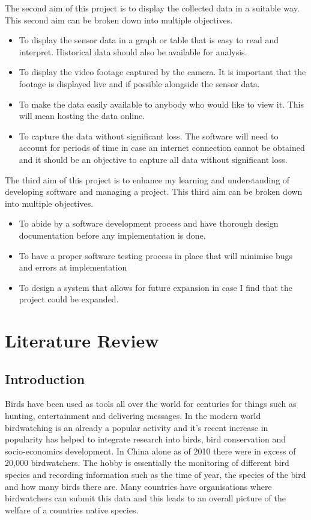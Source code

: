 \documentclass[10pt,a4paper]{article}
\begin{document}
The second aim of this project is to display the collected data in a suitable way. This second aim can be broken down into multiple objectives.
\begin{itemize}
\item To display the sensor data in a graph or table that is easy to read and interpret. Historical data should also be available for analysis. 

\item To display the video footage captured by the camera. It is important that the footage is displayed live and if possible alongside the sensor data. 

\item To make the data easily available to anybody who would like to view it. This will mean hosting the data online. 

\item To capture the data without significant loss. The software will need to account for periods of time in case an internet connection cannot be obtained and it should be an objective to capture all data without significant loss. 
\end{itemize}

The third aim of this project is to enhance my learning and understanding of developing software and managing a project. This third aim can be broken down into multiple objectives. 
\begin{itemize}
\item To abide by a software development process and have thorough design documentation before any implementation is done. 

\item To have a proper software testing process in place that will minimise bugs and errors at implementation

\item To design a system that allows for future expansion in case I find that the project could be expanded. 
\end{itemize}

\section{Literature Review}
\subsection{Introduction}
Birds have been used as tools all over the world for centuries for things such as hunting, entertainment and delivering messages. In the modern world birdwatching is an already a popular activity and it's recent increase in popularity has helped to integrate research into birds, bird conservation and socio-economics development\cite{Zhijun2013}. In China alone as of 2010 there were in excess of 20,000 birdwatchers\cite{Zhijun2013}. The hobby is essentially the monitoring of different bird species and recording information such as the time of year, the species of the bird and how many birds there are. Many countries have organisations where birdwatchers can submit this data and this leads to an overall picture of the welfare of a countries native species.
\end{document}
